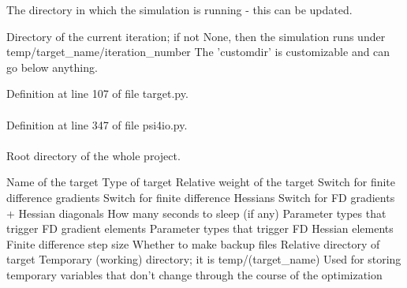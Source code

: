 \-The directory in which the simulation is running -\/ this can be updated. 

\-Directory of the current iteration; if not \-None, then the simulation runs under temp/target\-\_\-name/iteration\-\_\-number \-The 'customdir' is customizable and can go below anything.

\-Definition at line 107 of file target.\-py.

\hypertarget{classforcebalance_1_1psi4io_1_1RDVR3__Psi4_af469dd1fbd5c2542892e914dfb077433}{
\paragraph[{tdir}]{}}\label{classforcebalance_1_1psi4io_1_1RDVR3__Psi4_af469dd1fbd5c2542892e914dfb077433}


\-Definition at line 347 of file psi4io.\-py.

\hypertarget{classforcebalance_1_1target_1_1Target_aede2856573b890cd47054ad36937d6f6}{
\paragraph[{tempdir}]{}}\label{classforcebalance_1_1target_1_1Target_aede2856573b890cd47054ad36937d6f6}


\-Root directory of the whole project. 

\-Name of the target \-Type of target \-Relative weight of the target \-Switch for finite difference gradients \-Switch for finite difference \-Hessians \-Switch for \-F\-D gradients + \-Hessian diagonals \-How many seconds to sleep (if any) \-Parameter types that trigger \-F\-D gradient elements \-Parameter types that trigger \-F\-D \-Hessian elements \-Finite difference step size \-Whether to make backup files \-Relative directory of target \-Temporary (working) directory; it is temp/(target\-\_\-name) \-Used for storing temporary variables that don't change through the course of the optimization 

